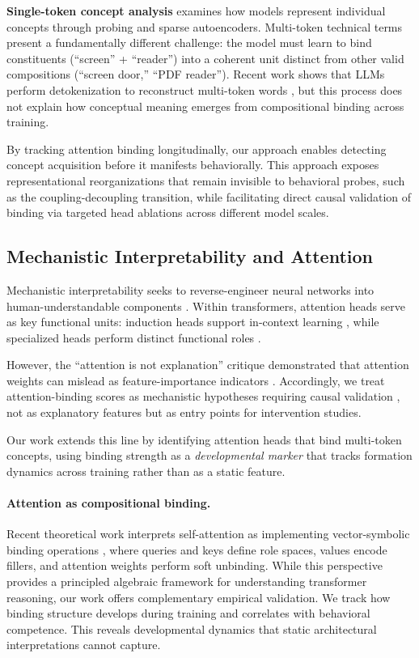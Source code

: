 \documentclass[10pt]{article} %
\begin{document}
\textbf{Single-token concept analysis} \citep{burns2022discovering,cunningham2023sparse} examines how models represent individual concepts through probing and sparse autoencoders.
Multi-token technical terms present a fundamentally different challenge: the model must learn to bind constituents (``screen'' + ``reader'') into a coherent unit distinct from other valid compositions (``screen door,'' ``PDF reader'').
Recent work shows that LLMs perform detokenization to reconstruct multi-token words \citep{kaplan2025from}, but this process does not explain how conceptual meaning emerges from compositional binding across training.

By tracking attention binding longitudinally, our approach enables detecting concept acquisition before it manifests behaviorally. This approach exposes representational reorganizations that remain invisible to behavioral probes, such as the coupling-decoupling transition, while facilitating direct causal validation of binding via targeted head ablations across different model scales.

\subsection{Mechanistic Interpretability and Attention}

Mechanistic interpretability seeks to reverse-engineer neural networks into human-understandable components \citep{olah2020zoom,elhage2021transformer}.
Within transformers, attention heads serve as key functional units: induction heads support in-context learning \citep{olsson2022context}, while specialized heads perform distinct functional roles \citep{voita2019analyzing}.

However, the ``attention is not explanation'' critique demonstrated that attention weights can mislead as feature-importance indicators \citep{jain2019attention,wiegreffe2019attention}.
Accordingly, we treat attention-binding scores as mechanistic hypotheses requiring causal validation \citep{olsson2022context}, not as explanatory features but as entry points for intervention studies.

Our work extends this line by identifying attention heads that bind multi-token concepts, using binding strength as a \emph{developmental marker} that tracks formation dynamics across training rather than as a static feature.

\paragraph{Attention as compositional binding.}
Recent theoretical work interprets self-attention as implementing vector-symbolic binding operations \citep{dhayalkar2025attention}, where queries and keys define role spaces, values encode fillers, and attention weights perform soft unbinding.
While this perspective provides a principled algebraic framework for understanding transformer reasoning, our work offers complementary empirical validation. We track how binding structure develops during training and correlates with behavioral competence. This reveals developmental dynamics that static architectural interpretations cannot capture.
\end{document}
